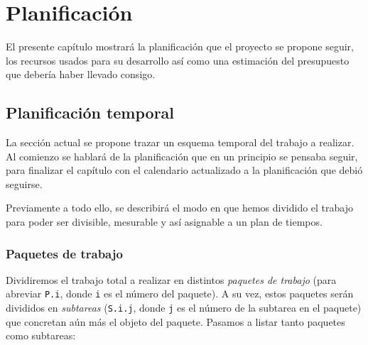 \chapter{Planificación}\label{chap:Plan}
El presente capítulo mostrará la planificación que el proyecto se propone seguir, los recursos usados para su desarrollo así como una estimación del presupuesto que debería haber llevado consigo.

\section{Planificación temporal}
La sección actual se propone trazar un esquema temporal del trabajo a realizar. Al comienzo se hablará de la planificación que en un principio se pensaba seguir, para finalizar el capítulo con el calendario actualizado a la planificación que debió seguirse.

Previamente a todo ello, se describirá el modo en que hemos dividido el trabajo para poder ser divisible, mesurable y así asignable a un plan de tiempos.

\subsection{Paquetes de trabajo}
Dividiremos el trabajo total a realizar en distintos \textit{paquetes de trabajo} (para abreviar \texttt{P.i}, donde \texttt{i} es el número del paquete). A su vez, estos paquetes serán divididos en \textit{subtareas} (\texttt{S.i.j}, donde \texttt{j} es el número de la subtarea en el paquete) que concretan aún más el objeto del paquete. Pasamos a listar tanto paquetes como subtareas:

